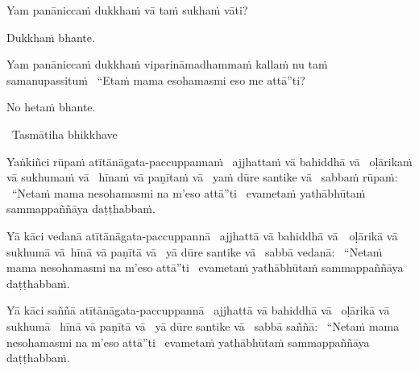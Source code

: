 \begin{pali-hangtogether}
  Yam panāniccaṁ dukkhaṁ vā taṁ sukhaṁ vāti?
\end{pali-hangtogether}

\begin{pali-hangtogether}
  Dukkhaṁ bhante.
\end{pali-hangtogether}

\begin{pali-hangtogether}
  Yam panāniccaṁ dukkhaṁ viparināmadhammaṁ kallaṁ nu taṁ samanupassituṁ \breathmark\ ``Etaṁ mama esohamasmi eso me attā''ti?
\end{pali-hangtogether}

\begin{pali-hangtogether}
  No hetaṁ bhante.
\end{pali-hangtogether}

\begin{leader-only}
  \anglebracketleft\ \hspace{-0.5mm}Tasmātiha bhikkhave \hspace{-0.5mm}\anglebracketright\
\end{leader-only}

\vspace{-0.99em} %

\begin{pali-hang}
  Yaṅkiñci rūpaṁ atītānāgata-paccuppannaṁ \breathmark\ ajjhattaṁ vā bahiddhā vā \breathmark\ oḷārikaṁ vā sukhumaṁ vā \breathmark\ hīnaṁ vā paṇītaṁ vā \breathmark\ yaṁ dūre santike vā \breathmark\ sabbaṁ rūpaṁ: \breathmark\ ``Netaṁ mama nesohamasmi na m'eso attā''ti \breathmark\ evametaṁ yathābhūtaṁ sammappaññāya daṭṭhabbaṁ.
\end{pali-hang}

\begin{pali-hang}
  Yā kāci vedanā atītānāgata-paccuppannā \breathmark\ ajjhattā vā bahiddhā \mbox{vā}~\breathmark\ oḷārikā vā sukhumā vā\breathmark\ hīnā vā paṇītā vā \breathmark\ yā dūre santike vā \breathmark\ sabbā vedanā: \breathmark\ ``Netaṁ mama nesohamasmi na m'eso attā''ti \breathmark\ evametaṁ yathābhūtaṁ sammappaññāya daṭṭhabbaṁ.
\end{pali-hang}

\begin{pali-hang}
  Yā kāci saññā atītānāgata-paccuppannā \breathmark\ ajjhattā vā bahiddhā vā \breathmark\ oḷārikā vā sukhumā \breathmark\ hīnā vā paṇītā vā \breathmark\ yā dūre santike vā \breathmark\ sabbā saññā: \breathmark\ ``Netaṁ mama nesohamasmi na m'eso attā''ti \breathmark\ evametaṁ yathābhūtaṁ sammappaññāya daṭṭhabbaṁ.
\end{pali-hang}

